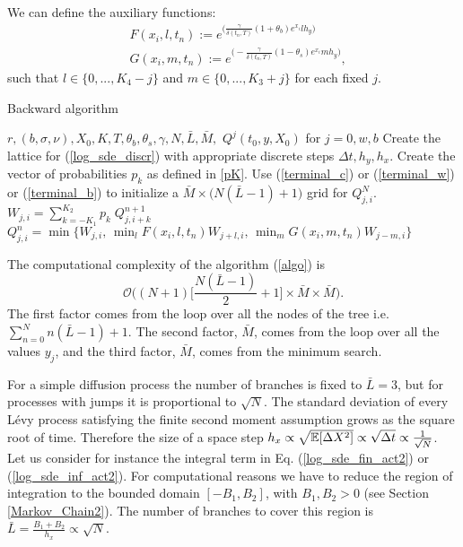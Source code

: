 We can define the auxiliary functions: 
\begin{align}\label{FG}
& F(x_i,l,t_n) := e^{\bigl(\frac{\gamma}{\delta(t_n,T)} (1+\theta_b) e^{x_i} lh_y \bigr)}  \\ \nonumber
& G(x_i,m,t_n) := e^{\bigl(- \frac{\gamma}{\delta(t_n,T)} (1-\theta_s) e^{x_i} mh_y \bigr)}, 
\end{align}
such that $l\in \{0,...,K_4-j\}$ and $m\in \{0,...,K_3+j\}$ for each fixed $j$. 
\begin{algorithm}[H] 
\caption{Backward algorithm}
\label{algo}
 \begin{algorithmic}[1]
    \REQUIRE $r, (b,\sigma,\nu), X_0, K, T, \theta_b, \theta_s, \gamma, N, \bar L, \bar M, $
    \ENSURE $Q^j(t_0,y,X_0)$ for $j=0,w,b$
      \STATE Create the lattice for (\ref{log_sde_discr}) with appropriate discrete steps $\Delta t, h_y, h_x$.
      \STATE Create the vector of probabilities $p_k$ as defined in \ref{pK}.  
      \STATE Use (\ref{terminal_c}) or (\ref{terminal_w}) or (\ref{terminal_b}) to initialize a $\bar M \times \bigl( N(\bar L-1)+1 \bigl)$ grid for $Q^N_{j,i}$.  
      \STATE $W_{j,i} = \sum_{k = -K_1}^{K_2} p_k \; Q^{n+1}_{j,i+k}$
      \STATE $Q^{n}_{j,i} = \min \biggl\{ W_{j,i} , \, \min_l F(x_i,l,t_n) W_{j+l,i}, \, \min_m G(x_i,m,t_n) W_{j-m,i}  \biggr\}$ 
      \ENDFOR
  \end{algorithmic}
\end{algorithm} 

\noindent
The computational complexity of the algorithm (\ref{algo}) is 
$$\mathcal{O}\biggl( (N+1)\bigl[\frac{N(\bar L-1)}{2}+1 \bigr] \times \bar M \times \bar M \biggr).$$
The first factor comes from the loop over all the nodes of the tree i.e. $\sum_{n=0}^N n(\bar L-1)+1$. The second factor, $\bar M$, comes from the loop over all the values $y_j$, 
and the third factor, $\bar M$, comes from the minimum search. 

For a simple diffusion process the number of branches is fixed to $\bar L = 3$, but for processes with jumps it is proportional to $\sqrt N$.
The standard deviation of every Lévy process satisfying the finite second moment assumption grows as the square root of time.
Therefore the size of a space step $h_x \propto \sqrt{\mathbb{E}[\Delta X^2]} \propto \sqrt{\Delta t} \propto \frac{1}{\sqrt{N}}$.
Let us consider for instance the integral term in Eq. (\ref{log_sde_fin_act2}) or (\ref{log_sde_inf_act2}).
For computational reasons we have to reduce the region of integration to the bounded domain $[-B_1,B_2]$, with $B_1,B_2>0$ (see Section \ref{Markov_Chain2}). 
The number of branches to cover this
region is $\bar L = \frac{B_1+B_2}{h_x} \propto \sqrt{N}$. 

